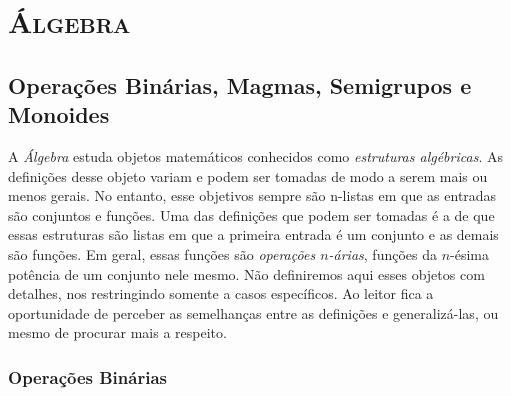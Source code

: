
\part{{\scshape Álgebra}}

\chapter{Operações Binárias, Magmas, Semigrupos e Monoides}

A \emph{Álgebra} estuda objetos matemáticos conhecidos como \emph{estruturas algébricas}. As definições desse objeto variam e podem ser tomadas de modo a serem mais ou menos gerais. No entanto, esse objetivos sempre são n-listas em que as entradas são conjuntos e funções. Uma das definições que podem ser tomadas é a de que essas estruturas são listas em que a primeira entrada é um conjunto e as demais são funções. Em geral, essas funções são \emph{operações $n$-árias}, funções da $n$-ésima potência de um conjunto nele mesmo. Não definiremos aqui esses objetos com detalhes, nos restringindo somente a casos específicos. Ao leitor fica a oportunidade de perceber as semelhanças entre as definições e generalizá-las, ou mesmo de procurar mais a respeito.

\section{Operações Binárias}

